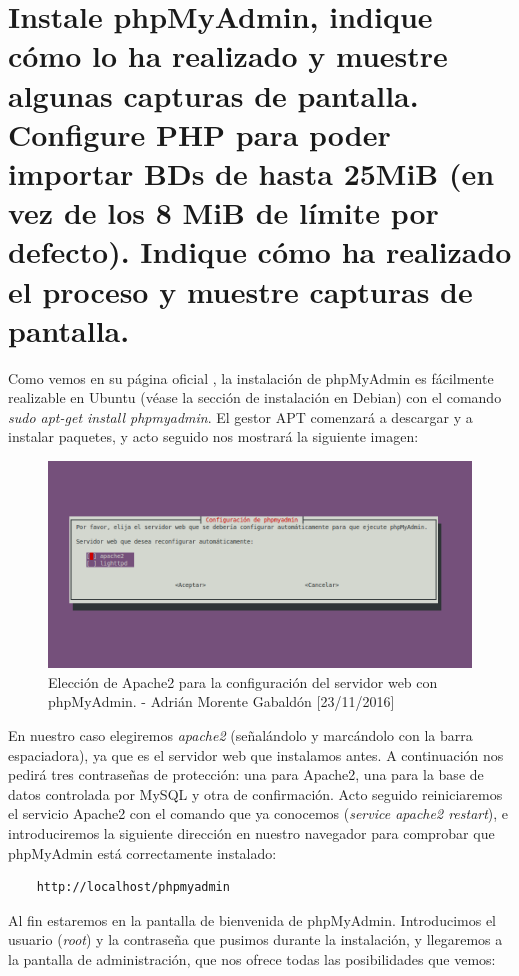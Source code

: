 \section{Instale phpMyAdmin, indique cómo lo ha realizado y muestre algunas capturas de pantalla. Configure PHP para poder importar BDs de hasta 25MiB (en vez de los 8 MiB de límite por defecto). Indique cómo ha realizado el proceso y muestre capturas de pantalla.}
Como vemos en su página oficial \cite{phpmyadmin}, la instalación de phpMyAdmin es fácilmente realizable en Ubuntu (véase la sección de instalación en Debian) con el comando \emph{sudo apt-get install phpmyadmin}. El gestor APT comenzará a descargar y a instalar paquetes, y acto seguido nos mostrará la siguiente imagen:
\begin{figure}[H]
	\centering
	\includegraphics[scale=0.5]{phpmyadmin-apache}
	\caption{Elección de Apache2 para la configuración del servidor web con phpMyAdmin. - Adrián Morente Gabaldón [23/11/2016]}
\end{figure} 
En nuestro caso elegiremos \emph{apache2} (señalándolo y marcándolo con la barra espaciadora), ya que es el servidor web que instalamos antes. A continuación nos pedirá tres contraseñas de protección: una para Apache2, una para la base de datos controlada por MySQL y otra de confirmación. Acto seguido reiniciaremos el servicio Apache2 con el comando que ya conocemos (\emph{service apache2 restart}), e introduciremos la siguiente dirección en nuestro navegador para comprobar que phpMyAdmin está correctamente instalado:
\begin{verbatim}
	http://localhost/phpmyadmin
\end{verbatim}
Al fin estaremos en la pantalla de bienvenida de phpMyAdmin. Introducimos el usuario (\emph{root}) y la contraseña que pusimos durante la instalación, y llegaremos a la pantalla de administración, que nos ofrece todas las posibilidades que vemos:
